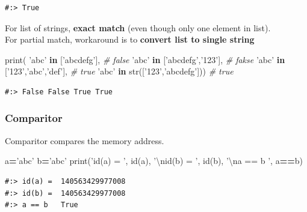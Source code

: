 \documentclass[
]{book}
\newenvironment{Shaded}{\begin{snugshade}}{\end{snugshade}}
\newcommand{\BuiltInTok}[1]{#1}
\newcommand{\CharTok}[1]{\textcolor[rgb]{0.5,0.5,0.5}{#1}}
\newcommand{\CommentTok}[1]{\textcolor[rgb]{0.37,0.37,0.37}{\textit{#1}}}
\newcommand{\KeywordTok}[1]{\textcolor[rgb]{0.27,0.27,0.27}{\textbf{#1}}}
\newcommand{\NormalTok}[1]{#1}
\newcommand{\OperatorTok}[1]{\textcolor[rgb]{0.43,0.43,0.43}{\textbf{#1}}}
\newcommand{\StringTok}[1]{\textcolor[rgb]{0.5,0.5,0.5}{#1}}
\begin{document}
\begin{verbatim}
#:> True
\end{verbatim}

For list of strings, \textbf{exact match} (even though only one element in list).\\
For partial match, workaround is to \textbf{convert list to single string}

\begin{Shaded}
\begin{Highlighting}[]
\BuiltInTok{print}\NormalTok{( }\StringTok{'abc'} \KeywordTok{in}\NormalTok{ [}\StringTok{'abcdefg'}\NormalTok{],             }\CommentTok{# false}
       \StringTok{'abc'} \KeywordTok{in}\NormalTok{ [}\StringTok{'abcdefg'}\NormalTok{,}\StringTok{'123'}\NormalTok{],       }\CommentTok{# fakse}
       \StringTok{'abc'} \KeywordTok{in}\NormalTok{ [}\StringTok{'123'}\NormalTok{,}\StringTok{'abc'}\NormalTok{,}\StringTok{'def'}\NormalTok{],     }\CommentTok{# true}
       \StringTok{'abc'} \KeywordTok{in} \BuiltInTok{str}\NormalTok{([}\StringTok{'123'}\NormalTok{,}\StringTok{'abcdefg'}\NormalTok{]))  }\CommentTok{# true}
\end{Highlighting}
\end{Shaded}

\begin{verbatim}
#:> False False True True
\end{verbatim}

\hypertarget{comparitor}{%
\subsubsection{Comparitor}\label{comparitor}}

Comparitor compares the memory address.

\begin{Shaded}
\begin{Highlighting}[]
\NormalTok{a}\OperatorTok{=}\StringTok{'abc'}
\NormalTok{b}\OperatorTok{=}\StringTok{'abc'}
\BuiltInTok{print}\NormalTok{(}\StringTok{'id(a) = '}\NormalTok{, }\BuiltInTok{id}\NormalTok{(a), }
      \StringTok{'}\CharTok{\textbackslash{}n}\StringTok{id(b) = '}\NormalTok{, }\BuiltInTok{id}\NormalTok{(b),}
      \StringTok{'}\CharTok{\textbackslash{}n}\StringTok{a == b  '}\NormalTok{, a}\OperatorTok{==}\NormalTok{b)}
\end{Highlighting}
\end{Shaded}

\begin{verbatim}
#:> id(a) =  140563429977008 
#:> id(b) =  140563429977008 
#:> a == b   True
\end{verbatim}
\end{document}
